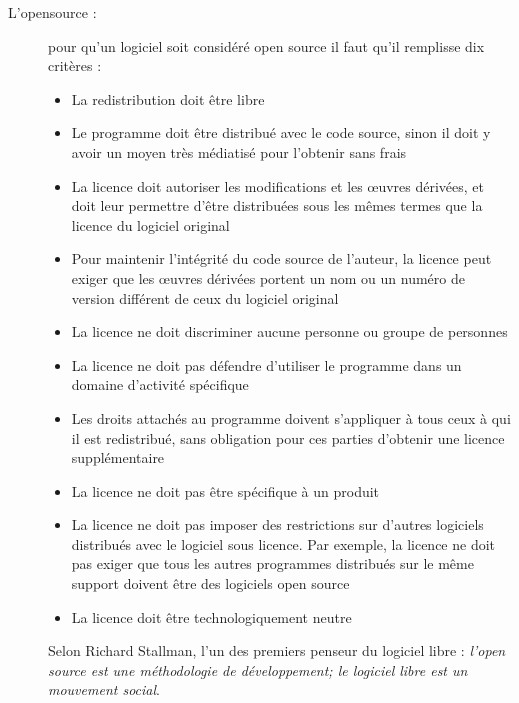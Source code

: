 \documentclass[a4paper,12pt]{article}
\begin{document}
	\begin{description}
		\item [L'opensource : ] pour qu'un logiciel soit considéré open source il faut qu'il remplisse dix critères :
		\begin{itemize}
			\item  La redistribution doit être libre
			\item Le programme doit être distribué avec le code source, sinon il doit y avoir un moyen très médiatisé pour l’obtenir sans frais
			\item La licence doit autoriser les modifications et les œuvres dérivées, et doit leur permettre d'être distribuées sous les mêmes termes que la licence du logiciel original
			\item Pour maintenir l’intégrité du code source de l'auteur, la licence peut exiger que les œuvres dérivées portent un nom ou un numéro de version différent de ceux du logiciel original
			\item La licence ne doit discriminer aucune personne ou groupe de personnes
			\item La licence ne doit pas défendre d'utiliser le programme dans un domaine d'activité spécifique
			\item Les droits attachés au programme doivent s'appliquer à tous ceux à qui il est redistribué, sans obligation pour ces parties d'obtenir une licence supplémentaire
			\item La licence ne doit pas être spécifique à un produit
			\item La licence ne doit pas imposer des restrictions sur d'autres logiciels distribués avec le logiciel sous licence. Par exemple, la licence ne doit pas exiger que tous les autres programmes distribués sur le même support doivent être des logiciels open source 
			\item La licence doit être technologiquement neutre
		\end{itemize}	
Selon Richard Stallman, l'un des premiers penseur du logiciel libre : \textit{l'open source est une méthodologie de développement; le logiciel libre est un mouvement social}. 


\end{description}
\end{document}
